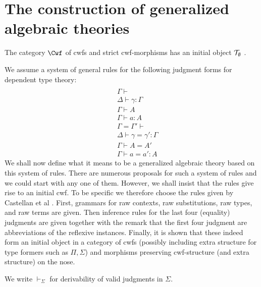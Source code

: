 \documentclass{lmcs}
\newtheorem{theorem}{Theorem}
\begin{document}

\section{The construction of generalized algebraic theories}

The category $\Cwf$ of cwfs and strict cwf-morphisms has an initial object ${\mathcal T}_\emptyset$ \cite{castellan}.

We assume a system of general rules for the following judgment forms for dependent type theory:
\begin{eqnarray*}
\\&&\Gamma \vdash
\\&&\Delta \vdash \gamma : \Gamma
\\&&\Gamma \vdash A
\\&&\Gamma \vdash a : A
\\&&\Gamma = \Gamma' \vdash
\\&&\Delta \vdash \gamma = \gamma' : \Gamma
\\&&\Gamma \vdash A = A'
\\&&\Gamma \vdash a = a' : A
\end{eqnarray*}
We shall now define what it means to be a generalized algebraic theory based on this system of rules. There are numerous proposals for such a system of rules and we could start with any one of them. However, we shall insist that the rules give rise to an initial cwf. To be specific we therefore choose the rules given by Castellan et al \cite{castellan:tlca2015}. First, grammars for raw contexts, raw substitutions, raw types, and raw terms are given. Then inference rules for the last four (equality) judgments are given together with the remark that the first four judgment are abbreviations of the reflexive instances. Finally, it is shown that these indeed form an initial object in a category of cwfs (possibly including extra structure for type formers such as $\Pi, \Sigma$) and morphisms preserving cwf-structure (and extra structure) on the nose.

We write $\vdash_\Sigma$ for derivability of valid judgments in $\Sigma$.

\end{document}
